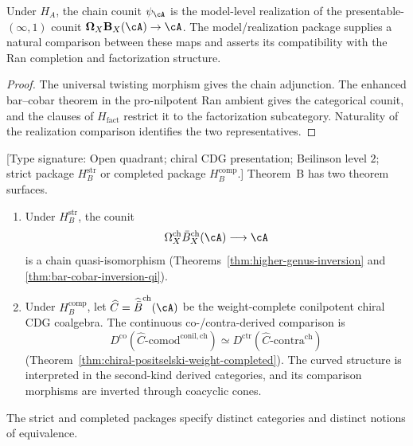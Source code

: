 \begin{proposition}
\label{prop:theorem-a-dual-lane-local-readout}
\ClaimStatusConditional
Under \(H_A\), the chain counit \(\psi_\cA\) is the model-level
realization of the presentable-\((\infty,1)\) counit
\(\boldsymbol\Omega_X\mathbf B_X(\cA)\to\cA\).
The model/realization package supplies a natural comparison between
these maps and asserts its compatibility with the Ran completion and
factorization structure.
\end{proposition}

\begin{proof}
The universal twisting morphism gives the chain adjunction.  The
enhanced bar--cobar theorem in the pro-nilpotent Ran ambient gives the
categorical counit, and the clauses of $H_{\mathrm{fact}}$ restrict it
to the factorization subcategory.  Naturality of the realization
comparison identifies the two representatives.
\end{proof}

\begin{theorem}
\label{thm:theorem-b-platonic-pointer}
\ClaimStatusConditional
\textup{[Type signature: Open quadrant; chiral CDG presentation;
Beilinson level \(2\); strict package \(H_B^{\mathrm{str}}\) or
completed package \(H_B^{\mathrm{comp}}\).]}
Theorem~B has two theorem surfaces.
\begin{enumerate}[label=\textup{(\alph*)}]
\item Under \(H_B^{\mathrm{str}}\), the counit
\[
 \Omega_X^{\mathrm{ch}}\bar B_X^{\mathrm{ch}}(\cA)
 \longrightarrow \cA
\]
is a chain quasi-isomorphism
(Theorems~\ref{thm:higher-genus-inversion} and
\ref{thm:bar-cobar-inversion-qi}).

\item Under \(H_B^{\mathrm{comp}}\), let
\(\widehat C=\widehat{\bar B}^{\mathrm{ch}}(\cA)\) be the
weight-complete conilpotent chiral CDG coalgebra.  The continuous
co-/contra-derived comparison is
\[
 D^{\mathrm{co}}\!\left(
 \widehat C\text{-}\mathrm{comod}^{\mathrm{conil,ch}}\right)
 \simeq
 D^{\mathrm{ctr}}\!\left(
 \widehat C\text{-}\mathrm{contra}^{\mathrm{ch}}\right)
\]
(Theorem~\ref{thm:chiral-positselski-weight-completed}).
The curved structure is interpreted in the second-kind derived
categories, and its comparison morphisms are inverted through
coacyclic cones.
\end{enumerate}
The strict and completed packages specify distinct categories and
distinct notions of equivalence.
\end{theorem}


